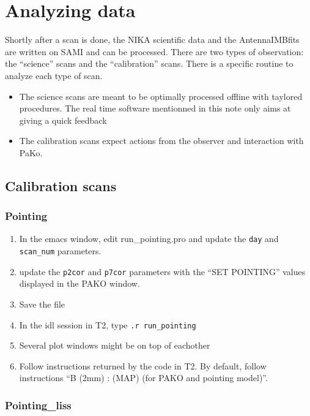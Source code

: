 \documentclass[a4paper,10pt]{article}
\begin{document}
\section{Analyzing data}

Shortly after a scan is done, the NIKA scientific data and the AntennaIMBfits
are written on SAMI and can be processed. There are two types of observation:
the ``science'' scans and the ``calibration'' scans. There is a specific routine
to analyze each type of scan.

\begin{itemize}
\item The science scans are meant
  to be optimally processed offline with taylored procedures. The real time
  software mentionned in this note only aims at giving a quick feedback
\item The calibration scans expect actions from the observer and interaction with
  PaKo.
\end{itemize}

\subsection{Calibration scans}

\subsubsection{Pointing}

\begin{enumerate}
\item In the emacs window, edit run\_pointing.pro and update the {\tt day} and
  {\tt scan\_num} parameters.
\item update the {\tt p2cor} and {\tt p7cor} parameters with the ``SET
  POINTING'' values displayed in the PAKO window.
\item Save the file
\item In the idl session in T2, type {\tt .r run\_pointing}
\item Several plot windows might be on top of eachother
\item Follow instructions returned by the code in T2. By default, follow
  instructions ``B (2mm) : (MAP) (for PAKO and pointing model)''.
\end{enumerate}

\subsubsection{Pointing\_liss}
\end{document}
